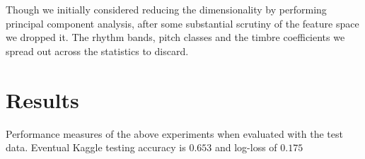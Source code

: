 \documentclass[fleqn,10pt]{SelfArx} %
\begin{document}
Though we initially considered reducing the dimensionality by performing principal component analysis, after some substantial scrutiny of the feature space we dropped it. The rhythm bands, pitch classes and the timbre coefficients we spread out across the statistics to discard.




\section{Results}

Performance measures of the above experiments when evaluated with the test data. Eventual Kaggle testing accuracy is $0.653$ and log-loss of $0.175$
\end{document}
